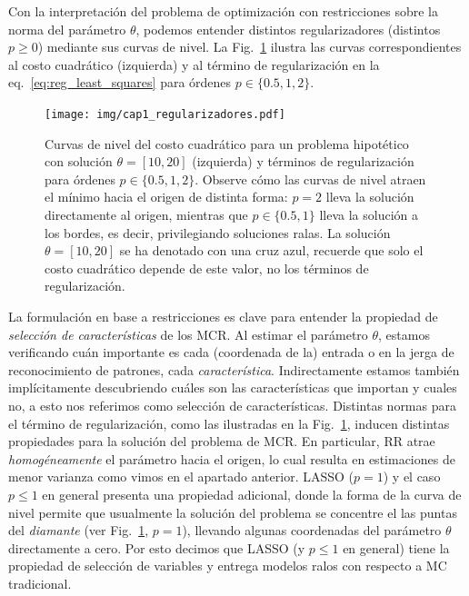 Con la interpretación del problema de optimización con restricciones sobre la norma del parámetro $\theta$, podemos entender distintos regularizadores (distintos $p\geq0$) mediante sus curvas de nivel. La Fig.~\ref{fig:reg_lin_reg} ilustra las curvas correspondientes al costo cuadrático (izquierda) y al término de regularización en la eq.~\eqref{eq:reg_least_squares} para órdenes $p\in\{0.5,1,2\}$. 

\begin{figure}[H]
	\centering
	\texttt{[image: img/cap1\_regularizadores.pdf]}\\
	\caption{Curvas de nivel del costo cuadrático para un problema hipotético con solución $\theta=[10,20]$ (izquierda) y términos de regularización para órdenes $p\in\{0.5,1,2\}$. Observe cómo las curvas de nivel atraen el mínimo hacia el origen de distinta forma: $p=2$ lleva la solución directamente al origen, mientras que $p\in\{0.5,1\}$ lleva la solución a los bordes, es  decir, privilegiando soluciones ralas. La solución $\theta=[10,20]$ se ha denotado con una cruz azul, recuerde que solo el costo cuadrático depende de este valor, no los términos de regularización. }
	\label{fig:reg_lin_reg}  
\end{figure}

La formulación en base a restricciones es clave para entender la propiedad de \emph{selección de características} de los MCR. Al estimar el parámetro $\theta$, estamos verificando cuán importante es cada (coordenada de la) entrada o en la jerga de reconocimiento de patrones, cada \emph{característica}. Indirectamente estamos también implícitamente descubriendo cuáles son las características que importan y cuales no, a esto nos referimos como selección de características. Distintas normas para el término de regularización, como las ilustradas en la Fig.~\ref{fig:reg_lin_reg}, inducen distintas propiedades para la solución del problema de MCR. En particular, RR atrae \emph{homogéneamente} el parámetro hacia el origen, lo cual resulta  en estimaciones de menor varianza como vimos en el apartado anterior. LASSO ($p=1$) y el caso $p\leq1$ en general presenta una propiedad adicional, donde la forma de la curva de nivel permite que usualmente la solución del problema se concentre el las puntas del \emph{diamante} (ver Fig.~\ref{fig:reg_lin_reg}, $p=1$), llevando algunas coordenadas del parámetro $\theta$ directamente a cero. Por esto decimos que LASSO (y $p\leq1$ en general) tiene la propiedad de selección de variables y entrega modelos ralos con respecto a MC tradicional. 

